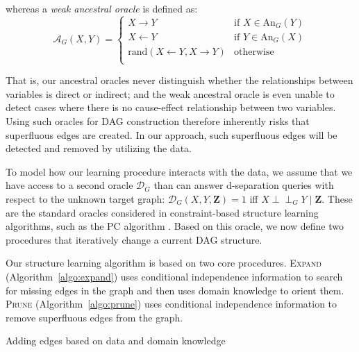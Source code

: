 \documentclass{uai2025} %
\def\ci{\perp\!\!\!\!\!\perp}
\begin{document}
whereas a \emph{weak ancestral oracle} is defined as:
$$
\mathcal{A}_G(X,Y)=\begin{cases}
 X \to Y & \textrm{if } X \in \textrm{An}_G(Y) \\
 X \gets Y & \textrm{if } Y \in \textrm{An}_G(X) \\
 \textrm{rand}(X \gets Y, X \to Y) & \textrm{otherwise} \\
\end{cases}
$$

That is, our ancestral oracles never distinguish whether the relationships
between variables is direct or indirect; and the weak ancestral oracle is even
unable to detect cases where there is no cause-effect relationship between two
variables. Using such oracles for DAG construction therefore inherently risks
that superfluous edges are created. In our approach, such superfluous edges
will be detected and removed by utilizing the data. 

To model how our learning procedure interacts with the data, we assume that we
have access to a second oracle $\mathcal{D}_G$ than can answer d-separation
queries with respect to the unknown target graph:
$\mathcal{D}_G(X,Y,\mathbf{Z})=1$ iff $X \ci_G Y \mid \mathbf{Z}$. These are
the standard oracles considered in constraint-based structure learning
algorithms, such as the PC algorithm \cite{Spirtes2001}. Based on this oracle,
we now define two procedures that iteratively change a current DAG structure.

Our structure learning algorithm is based on two core procedures.
\textsc{Expand} (Algorithm~\ref{algo:expand}) uses conditional independence
information to search for missing edges in the graph and then uses domain
knowledge to orient them. \textsc{Prune} (Algorithm~\ref{algo:prune}) uses
conditional independence information to remove superfluous edges from the
graph.

\begin{algorithm}[h]
\DontPrintSemicolon
\SetAlgoLined
{}
\caption{Adding edges based on data and domain knowledge}
\label{algo:expand}
\end{algorithm}
\end{document}
